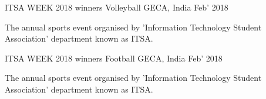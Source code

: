 

\begin{cventries}

  \cventry
    {ITSA WEEK 2018 winners} %
    {Volleyball} %
    {GECA, India} %
    {Feb' 2018} %
    {
     \begin{cvitems} %
        \item {The annual sports event organised by 'Information Technology Student Association' department known as ITSA.}
               {}
     \end{cvitems}
     }

 \cventry
    {ITSA WEEK 2018 winners} %
    {Football} %
    {GECA, India} %
    {Feb' 2018} %
    {
    \begin{cvitems} %
        \item {The annual sports event organised by 'Information Technology Student Association' department known as ITSA.}
               {}
     \end{cvitems}
    }
\iffalse 
 \cventry
    {} %
    {Badminton} %
    {GECA, India} %
    {} %
    {}
\cventry
    {} %
    {Painting and Sketching} %
    {GECA, India} %
    {} %
    {}
\fi
\end{cventries}
